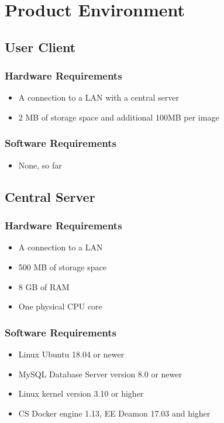 \section{Product Environment}
  \subsection{User Client}
    \subsubsection{Hardware Requirements}  
      \begin{itemize}
      \item A connection to a LAN with a central server
      \item 2 MB of storage space and additional 100MB per image
      \end{itemize}
    \subsubsection{Software Requirements}  
      \begin{itemize}
      \item None, so far
    \end{itemize}

  \subsection{Central Server}
    \subsubsection{Hardware Requirements}  
    \begin{itemize}
      \item A connection to a LAN
      \item 500 MB of storage space
      \item 8 GB of RAM
      \item One physical CPU core
    \end{itemize}
    \subsubsection{Software Requirements}  
    \begin{itemize}
      \item Linux Ubuntu 18.04 or newer
      \item MySQL Database Server version 8.0 or newer
      \item Linux kernel version 3.10 or higher
      \item CS Docker engine 1.13, EE Deamon 17.03 and higher
    \end{itemize}

